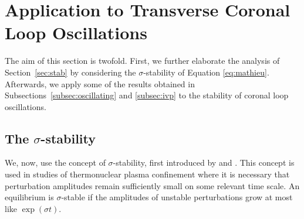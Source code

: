 \section{Application to Transverse Coronal Loop Oscillations}
\label{sec:loop}

The aim of this section is twofold.
First, we further elaborate the analysis of Section~\ref{sec:stab} by considering the $\sigma$-stability of Equation \eqref{eq:mathieu}.
Afterwards, we apply some of the results obtained in Subsections~\ref{subsec:oscillating} and \ref{subsec:ivp} to the stability of coronal loop oscillations.

\subsection{The \texorpdfstring{$\sigma$}{TEXT}-stability}
\label{subsec:sigma}

We, now, use the concept of $\sigma$-stability, first introduced by \cite{Goedbloed1974} and \cite{Sakanaka1974}.
This concept is used in studies of thermonuclear plasma confinement where it is necessary that perturbation amplitudes remain sufficiently small on some relevant time scale.
An equilibrium is $\sigma$-stable if the amplitudes of unstable perturbations grow at most like $\exp(\sigma t)$.

